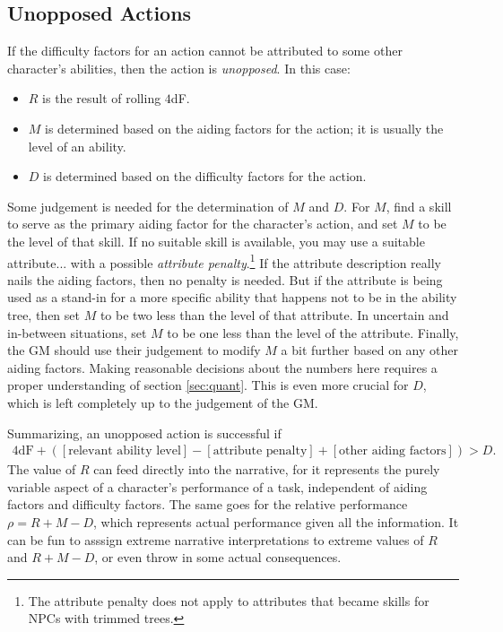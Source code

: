 \documentclass[12pt]{article}
\newcommand{\emdex}[1]{\emph{#1}\index{#1}}
\begin{document}
\subsection{Unopposed Actions}\label{sec:unopposed}
If the difficulty factors for an action cannot be attributed to some other character's abilities,
then the action is \emph{unopposed}.
In this case:
\vspace{-1em}
\begin{itemize}
\item $R$ is the result of rolling $4$dF.
\item $M$ is determined based on the aiding factors for the action; it is usually the level of an ability.
\item $D$ is determined based on the difficulty factors for the action.
\end{itemize}
Some judgement is needed for the determination of $M$ and $D$. For $M$,
find a skill to serve as the primary aiding factor for the character's action,
and set $M$ to be the level of that skill.
If no suitable skill is available, you may use a suitable attribute...
with a possible \emdex{attribute penalty}.\footnote{
The attribute penalty does not apply to attributes that became skills for NPCs with trimmed trees.}
If the attribute description really nails the aiding factors, then no penalty is needed.
But if the attribute is being used as a stand-in for a more specific ability that happens not to be in the ability tree,
then set $M$ to be two less than the level of that attribute.
In uncertain and in-between situations, set $M$ to be one less than the level of the attribute.
Finally, the GM should use their judgement to modify $M$ a bit further based on any other aiding factors.
Making reasonable decisions about the numbers here requires a proper understanding of section \ref{sec:quant}.
This is even more crucial for $D$, which is left completely up to the judgement of the GM.

Summarizing, an unopposed action is successful if
\begin{align*}
4\text{dF}
+([\text{relevant ability level}]
-[\text{attribute penalty}]
+[\text{other aiding factors}])
> D.
\end{align*}
The value of $R$ can feed directly into the narrative,
for it represents the purely variable aspect of a character's performance of a task,
independent of aiding factors and difficulty factors.
The same goes for the relative performance $\rho=R+M-D$, which represents actual performance given all the information.
It can be fun to asssign extreme narrative interpretations to extreme values of $R$ and $R+M-D$,
or even throw in some actual consequences.
\end{document}
